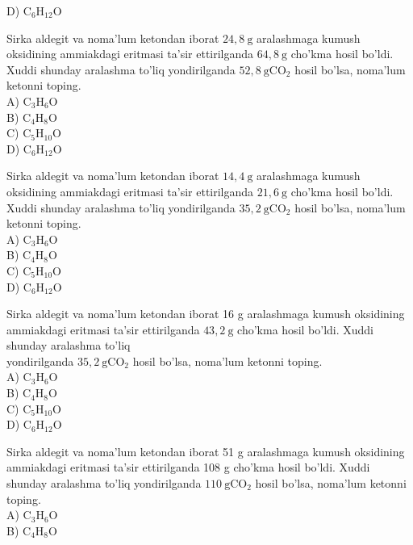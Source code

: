 D) $\mathrm{C}_{6} \mathrm{H}_{12} \mathrm{O}$
  \item Sirka aldegit va noma'lum ketondan iborat $24,8 \mathrm{~g}$ aralashmaga kumush oksidining ammiakdagi eritmasi ta'sir ettirilganda $64,8 \mathrm{~g}$ cho'kma hosil bo'ldi. Xuddi shunday aralashma to'liq yondirilganda $52,8 \mathrm{~g} \mathrm{CO}_{2}$ hosil bo'lsa, noma'lum ketonni toping.\\
A) $\mathrm{C}_{3} \mathrm{H}_{6} \mathrm{O}$\\
B) $\mathrm{C}_{4} \mathrm{H}_{8} \mathrm{O}$\\
C) $\mathrm{C}_{5} \mathrm{H}_{10} \mathrm{O}$\\
D) $\mathrm{C}_{6} \mathrm{H}_{12} \mathrm{O}$
  \item Sirka aldegit va noma'lum ketondan iborat $14,4 \mathrm{~g}$ aralashmaga kumush oksidining ammiakdagi eritmasi ta'sir ettirilganda $21,6 \mathrm{~g}$ cho'kma hosil bo'ldi. Xuddi shunday aralashma to'liq yondirilganda $35,2 \mathrm{~g} \mathrm{CO}_{2}$ hosil bo'lsa, noma'lum ketonni toping.\\
A) $\mathrm{C}_{3} \mathrm{H}_{6} \mathrm{O}$\\
B) $\mathrm{C}_{4} \mathrm{H}_{8} \mathrm{O}$\\
C) $\mathrm{C}_{5} \mathrm{H}_{10} \mathrm{O}$\\
D) $\mathrm{C}_{6} \mathrm{H}_{12} \mathrm{O}$
  \item Sirka aldegit va noma'lum ketondan iborat 16 g aralashmaga kumush oksidining ammiakdagi eritmasi ta'sir ettirilganda $43,2 \mathrm{~g}$ cho'kma hosil bo'ldi. Xuddi shunday aralashma to'liq\\
yondirilganda $35,2 \mathrm{~g} \mathrm{CO}_{2}$ hosil bo'lsa, noma'lum ketonni toping.\\
A) $\mathrm{C}_{3} \mathrm{H}_{6} \mathrm{O}$\\
B) $\mathrm{C}_{4} \mathrm{H}_{8} \mathrm{O}$\\
C) $\mathrm{C}_{5} \mathrm{H}_{10} \mathrm{O}$\\
D) $\mathrm{C}_{6} \mathrm{H}_{12} \mathrm{O}$
  \item Sirka aldegit va noma'lum ketondan iborat 51 g aralashmaga kumush oksidining ammiakdagi eritmasi ta'sir ettirilganda 108 g cho'kma hosil bo'ldi. Xuddi shunday aralashma to'liq yondirilganda $110 \mathrm{~g} \mathrm{CO}_{2}$ hosil bo'lsa, noma'lum ketonni toping.\\
A) $\mathrm{C}_{3} \mathrm{H}_{6} \mathrm{O}$\\
B) $\mathrm{C}_{4} \mathrm{H}_{8} \mathrm{O}$\\
